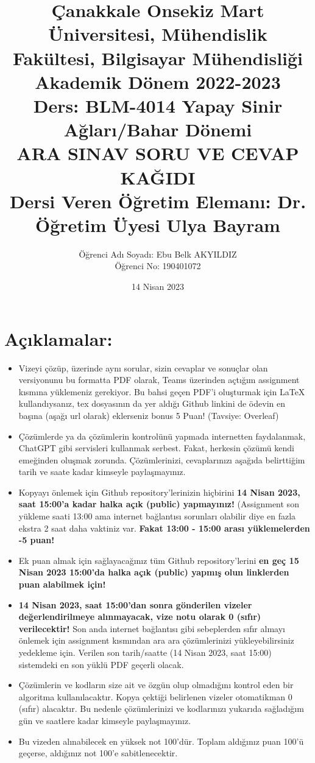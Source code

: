 \documentclass[11pt]{article}
\title{Çanakkale Onsekiz Mart Üniversitesi, Mühendislik Fakültesi, Bilgisayar Mühendisliği Akademik Dönem 2022-2023\\
Ders: BLM-4014 Yapay Sinir Ağları/Bahar Dönemi\\ 
ARA SINAV SORU VE CEVAP KAĞIDI\\
Dersi Veren Öğretim Elemanı: Dr. Öğretim Üyesi Ulya Bayram}
\author{%
\begin{minipage}{\textwidth}
\raggedright
Öğrenci Adı Soyadı: Ebu Belk AKYILDIZ\\ %
Öğrenci No: 190401072
\end{minipage}%
}
\date{14 Nisan 2023}
\begin{document}
\maketitle
\vspace{-.5in}
\section*{Açıklamalar:}
\begin{itemize}
    \item Vizeyi çözüp, üzerinde aynı sorular, sizin cevaplar ve sonuçlar olan versiyonunu bu formatta PDF olarak, Teams üzerinden açtığım assignment kısmına yüklemeniz gerekiyor. Bu bahsi geçen PDF'i oluşturmak için LaTeX kullandıysanız, tex dosyasının da yer aldığı Github linkini de ödevin en başına (aşağı url olarak) eklerseniz bonus 5 Puan! (Tavsiye: Overleaf)
    \item Çözümlerde ya da çözümlerin kontrolünü yapmada internetten faydalanmak, ChatGPT gibi servisleri kullanmak serbest. Fakat, herkesin çözümü kendi emeğinden oluşmak zorunda. Çözümlerinizi, cevaplarınızı aşağıda belirttiğim tarih ve saate kadar kimseyle paylaşmayınız. 
    \item Kopyayı önlemek için Github repository'lerinizin hiçbirini \textbf{14 Nisan 2023, saat 15:00'a kadar halka açık (public) yapmayınız!} (Assignment son yükleme saati 13:00 ama internet bağlantısı sorunları olabilir diye en fazla ekstra 2 saat daha vaktiniz var. \textbf{Fakat 13:00 - 15:00 arası yüklemelerden -5 puan!}
    \item Ek puan almak için sağlayacağınız tüm Github repository'lerini \textbf{en geç 15 Nisan 2023 15:00'da halka açık (public) yapmış olun linklerden puan alabilmek için!}
    \item \textbf{14 Nisan 2023, saat 15:00'dan sonra gönderilen vizeler değerlendirilmeye alınmayacak, vize notu olarak 0 (sıfır) verilecektir!} Son anda internet bağlantısı gibi sebeplerden sıfır almayı önlemek için assignment kısmından ara ara çözümlerinizi yükleyebilirsiniz yedekleme için. Verilen son tarih/saatte (14 Nisan 2023, saat 15:00) sistemdeki en son yüklü PDF geçerli olacak.
    \item Çözümlerin ve kodların size ait ve özgün olup olmadığını kontrol eden bir algoritma kullanılacaktır. Kopya çektiği belirlenen vizeler otomatikman 0 (sıfır) alacaktır. Bu nedenle çözümlerinizi ve kodlarınızı yukarıda sağladığım gün ve saatlere kadar kimseyle paylaşmayınız.
    \item Bu vizeden alınabilecek en yüksek not 100'dür. Toplam aldığınız puan 100'ü geçerse, aldığınız not 100'e sabitlenecektir.

\end{itemize}
\end{document}
